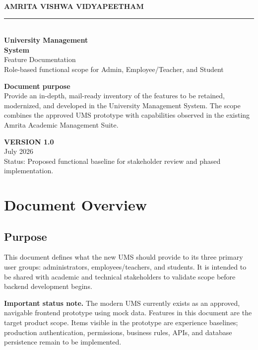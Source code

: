 \documentclass[10pt,a4paper]{article}
\begin{document}
\begin{titlepage}
\pagecolor{AmritaDark}
\color{white}
\vspace*{1.8cm}
{\Large\textbf{AMRITA VISHWA VIDYAPEETHAM}}\\[0.3cm]
{\color{AmritaGold}\rule{\textwidth}{1.2pt}}\\[1.4cm]
{\Huge\bfseries University Management\\[0.15cm]System}\\[0.6cm]
{\LARGE Feature Documentation}\\[0.35cm]
{\large Role-based functional scope for Admin, Employee/Teacher, and Student}\\[1.2cm]

\begin{tcolorbox}[colback=white!7!AmritaDark,colframe=AmritaGold,boxrule=0.8pt,arc=3mm]
\color{white}
\textbf{Document purpose}\\
Provide an in-depth, mail-ready inventory of the features to be retained,
modernized, and developed in the University Management System. The scope
combines the approved UMS prototype with capabilities observed in the existing
Amrita Academic Management Suite.
\end{tcolorbox}

\vfill
{\color{AmritaGold}\textbf{VERSION 1.0}}\\
July 2026\\[0.6cm]
{\small Status: Proposed functional baseline for stakeholder review and phased implementation.}
\end{titlepage}
\nopagecolor
\color{black}

\tableofcontents
\newpage

\section{Document Overview}

\subsection{Purpose}
This document defines what the new UMS should provide to its three primary user
groups: administrators, employees/teachers, and students. It is intended to be
shared with academic and technical stakeholders to validate scope before
backend development begins.

\begin{scopebox}
\textbf{Important status note.} The modern UMS currently exists as an approved,
navigable frontend prototype using mock data. Features in this document are the
target product scope. Items visible in the prototype are experience baselines;
production authentication, permissions, business rules, APIs, and database
persistence remain to be implemented.
\end{scopebox}
\end{document}
